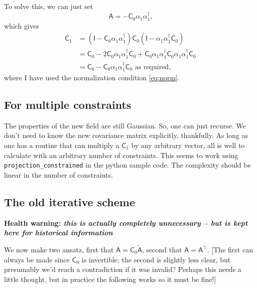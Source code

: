 \documentclass[11pt,a4paper,preprint]{aastex}
\begin{document}
To solve this, we can just set
\begin{equation}
\mathsf{A} = - \mathsf{C}_0 \alpha_1 \alpha_1^{\dagger}\textrm{,}\label{eq:A}
\end{equation}
which gives
\begin{align}
\mathsf{C}_1 & = (\mathsf{I} - \mathsf{C}_0 \alpha_1
\alpha_1^{\dagger}) \mathsf{C}_0  (\mathsf{I} - \alpha_1
\alpha_1^{\dagger} \mathsf{C}_0 ) \\
& = \mathsf{C}_0 - 2 \mathsf{C}_0 \alpha_1 \alpha_1^{\dagger}
\mathsf{C}_0 + \mathsf{C}_0 \alpha_1 \alpha_1^{\dagger}
\mathsf{C}_0 \alpha_1 \alpha_1^{\dagger}
\mathsf{C}_0  \\
& = \mathsf{C}_0 - \mathsf{C}_0 \alpha_1 \alpha_1^{\dagger}
\mathsf{C}_0\textrm{ as required,}
\end{align}
where I have used the normalization condition \eqref{eq:norm}.

\pagebreak

\subsection{For multiple constraints}

The properties of the new field are still Gaussian. So, one can just
recurse. We don't need to know the new covariance matrix explicitly,
thankfully.  As long as one has a routine that can multiply a
$\mathsf{C}_1$ by any arbitrary vector, all is well to calculate with
an arbitrary number of constraints. This seems to work using
\texttt{projection\_constrained} in the python sample code. The
complexity should be linear in the number of constraints.

\subsection{The old iterative scheme}

{\bf Health warning: \it this is actually completely unnecessary -- but is kept here for
  historical information}

 We now make two ansatz, first that
$\mathsf{A} = \mathsf{C}_0 \tilde{\mathsf{A}}$, second that $\mathsf{A} =
\mathsf{A}^{\top}$. [The first can always be made since $\mathsf{C}_0$
is invertible; the second is slightly less clear, but presumably we'd
reach a contradiction if it was invalid? Perhaps this needs a little
thought, but in practice the following works so it must be fine!]
\end{document}
